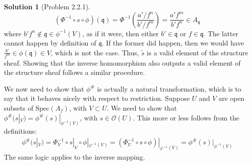 \documentclass[aps,pra,showpacs,notitlepage,onecolumn,superscriptaddress,nofootinbib]{revtex4-1}
\theoremstyle{definition}
\newtheorem{solution}{Solution}[section]
\begin{document}
\begin{solution}[Problem 2.2.1]
\begin{equation}
    (\Phi^{-1} \circ s \circ \phi)(\mathfrak{q}) = \Phi^{-1} \left( \frac{a'/f^n}{b'/f^m} \right) = \frac{a' f^m}{b' f^n} \in A_{\mathfrak{q}}
  \end{equation}
  where $b' f^n \notin \mathfrak{q} \in \phi^{-1}(V)$, as if it were, then either $b' \in \mathfrak{q}$ or $f \in \mathfrak{q}$. The latter cannot happen by definition of $\mathfrak{q}$. If the former did happen, then
  we would have $\frac{b'}{f^m} \in \phi(\mathfrak{q}) \in V$, which is not the case. Thus, $\widetilde{s}$ is a valid element of the structure sheaf. Showing that the inverse homomorphism
  also outputs a valid element of the structure sheaf follows a similar procedure.
  \newline

  \noindent We now need to show that $\phi^{\#}$ is actually a natural transformation, which is to say that it behaves nicely with respect to restriction. Suppose $U$ and $V$ are open
  subsets of $\text{Spec}(A_f)$, with $V \subset U$. We need to show that $\phi^{\#}(s|_V) = \phi^{\#}(s)|_{\phi^{-1}(V)}$, with $s \in \mathcal{O}(U)$. This more or less follows from the
  definitions:
  \begin{align}
    \phi^{\#}(s|_V) = \Phi^{-1}_V \circ s|_V \circ \phi|_{\varphi^{-1}(V)} = (\Phi^{-1}_U \circ s \circ \phi)|_{\varphi^{-1}(V)} = \phi^{\#}(s)|_{\phi^{-1}(V)}
    \end{align}
  The same logic applies to the inverse mapping.
  \newline


\end{solution}
\end{document}
